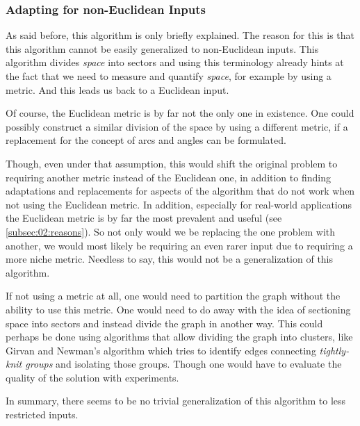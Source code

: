 \subsubsection{Adapting for non-Euclidean Inputs}

As said before, this algorithm is only briefly explained.
The reason for this is that this algorithm cannot be easily generalized to non-Euclidean inputs.
This algorithm divides \emph{space} into sectors 
and using this terminology already hints at the fact that we need to measure and quantify \emph{space}, for example by using a metric.
And this leads us back to a Euclidean input.

Of course, the Euclidean metric is by far not the only one in existence.
One could possibly construct a similar division of the space by using a different metric, if a replacement for the concept of arcs and angles can be formulated.

Though, even under that assumption, this would shift the original problem to requiring another metric instead of the Euclidean one, 
in addition to finding adaptations and replacements for aspects of the algorithm that do not work when not using the Euclidean metric.
In addition, especially for real-world applications the Euclidean metric is by far the most prevalent and useful (see \cref{subsec:02:reasons}).
So not only would we be replacing the one problem with another, we would most likely be requiring an even rarer input due to requiring a more niche metric.
Needless to say, this would not be a generalization of this algorithm.

If not using a metric at all, one would need to partition the graph without the ability to use this metric. 
One would need to do away with the idea of sectioning space into sectors and instead divide the graph in another way.
This could perhaps be done using algorithms that allow dividing the graph into clusters, like Girvan and Newman's algorithm \cite{girvan_community_2002} which tries to identify edges connecting \emph{tightly-knit groups} and isolating those groups.
Though one would have to evaluate the quality of the solution with experiments.

In summary, there seems to be no trivial generalization of this algorithm to less restricted inputs.